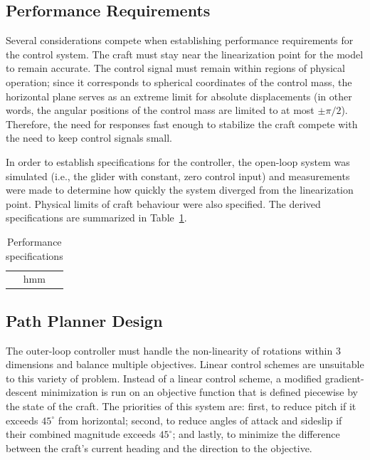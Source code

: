 \documentclass{sydeStyle}
\begin{document}
\subsection{Performance Requirements}
\label{sec:perfreq}

Several considerations compete when establishing performance requirements for
the control system.  The craft must stay near the linearization point for the
model to remain accurate.  The control signal must remain within regions of
physical operation; since it corresponds to spherical coordinates of the control
mass, the horizontal plane serves as an extreme limit for absolute displacements
(in other words, the angular positions of the control mass are limited to at
most $\pm \pi/2$).  Therefore, the need for responses fast enough to stabilize
the craft compete with the need to keep control signals small.

In order to establish specifications for the controller, the open-loop
system was simulated (i.e., the glider with constant, zero control input) and
measurements were made to determine how quickly the system diverged from the
linearization point.  Physical limits of craft behaviour were also specified.
The derived specifications are summarized in Table~\ref{tab:specs}.

\begin{table}[b]
    \centering
    \begin{tabular}{|c|}
        hmm
    \end{tabular}
    \caption{Performance specifications}
    \label{tab:specs}
\end{table}

\subsection{Path Planner Design}
\label{sec:ppdesign}
The outer-loop controller must handle the non-linearity of rotations within 3
dimensions and balance multiple objectives. Linear control schemes are
unsuitable to this variety of problem. Instead of a linear control scheme, a
modified gradient-descent minimization is run on an objective function that is
defined piecewise by the state of the craft. The priorities of this system are:
first, to reduce pitch if it exceeds $45^{\circ}$ from horizontal; second,
to reduce angles of attack and sideslip if their combined magnitude exceeds
$45^{\circ}$; and lastly, to minimize the difference between the craft's current
heading and the direction to the objective.
\end{document}
